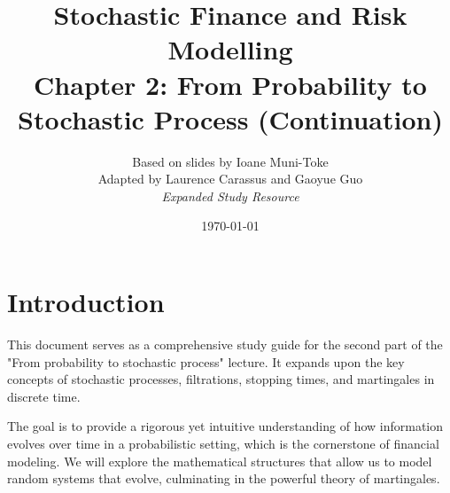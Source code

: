 \documentclass[12pt, a4paper]{report}
\title{\textbf{Stochastic Finance and Risk Modelling} \\ \large Chapter 2: From Probability to Stochastic Process (Continuation)}
\author{Based on slides by Ioane Muni-Toke \\ Adapted by Laurence Carassus and Gaoyue Guo \\ \textit{Expanded Study Resource}}
\date{\today}
\theoremstyle{definition}
\begin{document}
\maketitle

\tableofcontents

\chapter*{Introduction}

This document serves as a comprehensive study guide for the second part of the "From probability to stochastic process" lecture. It expands upon the key concepts of stochastic processes, filtrations, stopping times, and martingales in discrete time.

The goal is to provide a rigorous yet intuitive understanding of how information evolves over time in a probabilistic setting, which is the cornerstone of financial modeling. We will explore the mathematical structures that allow us to model random systems that evolve, culminating in the powerful theory of martingales.





\end{document}
